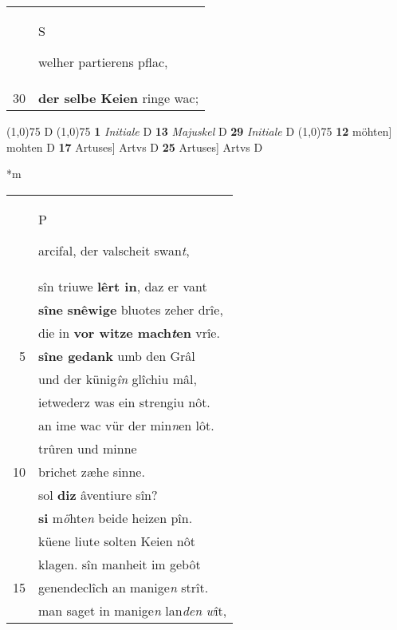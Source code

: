 \documentclass[8pt,a4paper,notitlepage]{article}
\begin{document}
\begin{table}[ht]
\begin{minipage}[t]{0.5\linewidth}
\begin{tabular}{rl}
 & \begin{large}S\end{large}welher partierens pflac,\\ 
30 & \textbf{der selbe Keien} ringe wac;\\ 
\end{tabular}
\scriptsize
\line(1,0){75} \newline
D \newline
\line(1,0){75} \newline
\textbf{1} \textit{Initiale} D  \textbf{13} \textit{Majuskel} D  \textbf{29} \textit{Initiale} D  \newline
\line(1,0){75} \newline
\textbf{12} möhten] mohten D \textbf{17} Artuses] Artvs D \textbf{25} Artuses] Artvs D \newline
\end{minipage}
\hspace{0.5cm}
\begin{minipage}[t]{0.5\linewidth}
\small
\begin{center}*m
\end{center}
\begin{tabular}{rl}
 & \begin{large}P\end{large}arcifal, der valscheit swan\textit{t},\\ 
 & sîn triuwe \textbf{lêrt in}, daz er vant\\ 
 & \textbf{sîne} \textbf{snêwige} bluotes zeher drîe,\\ 
 & die in \textbf{vor witze mach\textit{t}en} vrîe.\\ 
5 & \textbf{sîne gedank} umb den Grâl\\ 
 & und der künig\textit{în} glîchiu mâl,\\ 
 & ietwederz was ein strengiu nôt.\\ 
 & an ime wac vür der min\textit{n}en lôt.\\ 
 & trûren und minne\\ 
10 & brichet zæhe sinne.\\ 
 & sol \textbf{diz} âventiure sîn?\\ 
 & \textbf{si} m\textit{ö}hte\textit{n} beide heizen pîn.\\ 
 & küene liute solten Keien nôt\\ 
 & klagen. sîn manheit im gebôt\\ 
15 & genendeclîch an manige\textit{n} strît.\\ 
 & man saget in manige\textit{n} lan\textit{den} \textit{w}ît,\\ 

\end{tabular}
\end{minipage}
\end{table}
\end{document}
